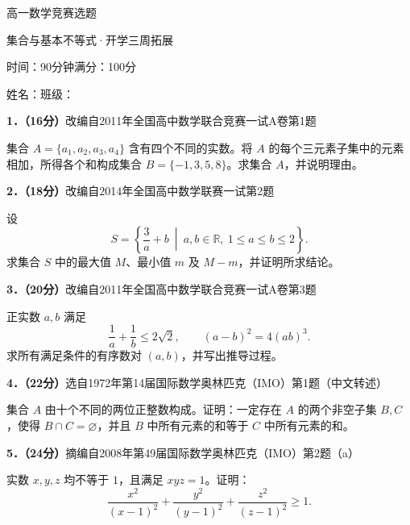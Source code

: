 \documentclass[UTF8,a4paper,12pt]{ctexart}
\newcommand{\src}[1]{{\small #1}\par}
\begin{document}
\begin{center}{\LARGE 高一数学竞赛选题}\par 集合与基本不等式·开学三周拓展\par 时间：90分钟\qquad 满分：100分\end{center}
姓名：\underline{\hspace{3cm}}\qquad 班级：\underline{\hspace{3cm}}

\textbf{1．（16分）}\src{改编自2011年全国高中数学联合竞赛一试A卷第1题}
集合 $A=\{a_1,a_2,a_3,a_4\}$ 含有四个不同的实数。将 $A$ 的每个三元素子集中的元素相加，所得各个和构成集合 $B=\{-1,3,5,8\}$。求集合 $A$，并说明理由。
\par\vspace*{2.4cm}

\textbf{2．（18分）}\src{改编自2014年全国高中数学联赛一试第2题}
设
\[S=\left\{\frac3a+b\ \middle|\ a,b\in\mathbb R,\ 1\le a\le b\le2\right\}.\]
求集合 $S$ 中的最大值 $M$、最小值 $m$ 及 $M-m$，并证明所求结论。
\par\vspace*{2.4cm}

\textbf{3．（20分）}\src{改编自2011年全国高中数学联合竞赛一试A卷第3题}
正实数 $a,b$ 满足
\[\frac1a+\frac1b\le2\sqrt2,\qquad (a-b)^2=4(ab)^3.\]
求所有满足条件的有序数对 $(a,b)$，并写出推导过程。
\par\vspace*{2.4cm}
\newpage
\textbf{4．（22分）}\src{选自1972年第14届国际数学奥林匹克（IMO）第1题（中文转述）}
集合 $A$ 由十个不同的两位正整数构成。证明：一定存在 $A$ 的两个非空子集 $B,C$，使得 $B\cap C=\varnothing$，并且 $B$ 中所有元素的和等于 $C$ 中所有元素的和。
\par\vspace*{6cm}

\textbf{5．（24分）}\src{摘编自2008年第49届国际数学奥林匹克（IMO）第2题（a）}
实数 $x,y,z$ 均不等于 $1$，且满足 $xyz=1$。证明：
\[\frac{x^2}{(x-1)^2}+\frac{y^2}{(y-1)^2}+\frac{z^2}{(z-1)^2}\ge1.\]
\par\vspace*{6cm}
\end{document}
